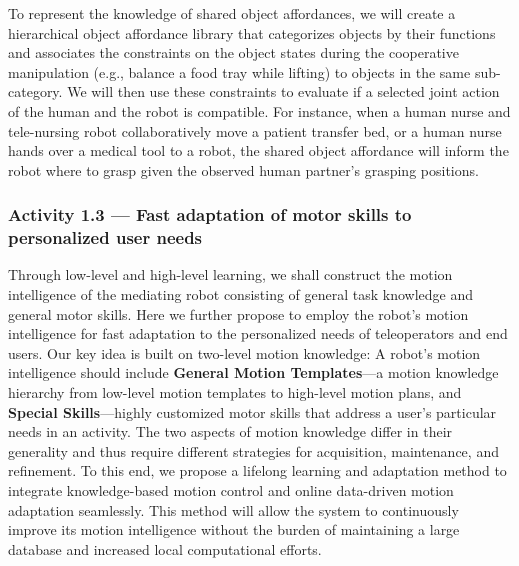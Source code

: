 \documentclass[letterpaper, 11 pt, onecolumn]{article}
\begin{document}
To represent the knowledge of shared object affordances, we will create a hierarchical object affordance library that categorizes objects by their functions and associates the constraints on the object states during the cooperative manipulation (e.g., balance a food tray while lifting) 
to objects in the same sub-category. We will then use these constraints to evaluate if a selected joint action of the human and the robot is compatible. For instance, when a human nurse and tele-nursing robot collaboratively move a patient transfer bed, or a human nurse hands over a medical tool to a robot, the shared object affordance will inform the robot where to grasp given the observed human partner's grasping positions.

\subsubsection{Activity 1.3 --- Fast adaptation of motor skills to personalized user needs}\label{sec:plan-motion-update}
Through low-level and high-level learning, we shall construct the motion intelligence of the mediating robot consisting of general task knowledge and general motor skills. Here we further propose to %
employ the robot's motion intelligence for fast adaptation to the personalized needs of teleoperators and end users. Our key idea is built on two-level motion knowledge: A robot's motion intelligence should include \textbf{General Motion Templates}---a motion knowledge hierarchy from low-level motion templates to high-level motion plans, and \textbf{Special Skills}---highly customized motor skills that address a user's particular needs in an activity. The two aspects of motion knowledge differ in their generality and thus require different strategies for acquisition, maintenance, and refinement. To this end, we propose a lifelong learning and adaptation method to integrate knowledge-based motion control and online data-driven motion adaptation seamlessly. This method will allow the system to continuously improve its motion intelligence without the burden of maintaining a large database and increased local computational efforts. 
\end{document}

